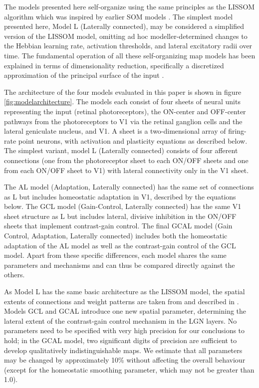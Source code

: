 \documentclass{article}
\begin{document}
The models presented here self-organize using the same principles as
the LISSOM algorithm \citep{Miikkulainen2005} which was inspired by
earlier SOM models \citep{kohonen:original,obermayer:principle}. The
simplest model presented here, Model L (Laterally connected), may be
considered a simplified version of the LISSOM model, omitting ad hoc
modeller-determined changes to the Hebbian learning rate,
activation thresholds, and lateral excitatory radii over time.
The fundamental operation of all these self-organizing map models has
been explained in terms of dimensionality reduction, specifically a discretized
approximation of the principal surface of the input
\citep{ritter:neural}.

The architecture of the four models evaluated in this paper is shown
in figure \ref{fig:modelarchitecture}. The models each consist of
four sheets of neural units representing the input (retinal
photoreceptors), the ON-center and OFF-center pathways from the
photoreceptors to V1 via the retinal ganglion cells and the lateral
geniculate nucleus, and V1. A sheet is a two-dimensional array of
firing-rate point neurons, with activation and plasticity equations
as described below. The simplest variant, model L (Laterally
connected) consists of four afferent connections (one from the
photoreceptor sheet to each ON/OFF sheets and one from each
ON/OFF sheet to V1) with lateral connectivity only in the V1 sheet.

The AL model (Adaptation, Laterally connected) has the same set of
connections as L but includes homeostatic adaptation in V1, described
by the equations below. The GCL model (Gain-Control, Laterally
connected) has the same V1 sheet structure as L but includes lateral,
divisive inhibition in the ON/OFF sheets that implement contrast-gain
control. The final GCAL model (Gain Control, Adaptation, Laterally
connected) includes both the homeostatic adaptation of the AL model as
well as the contrast-gain control of the GCL model. Apart from these
specific differences, each model shares the same parameters and
mechanisms and can thus be compared directly against the others.

  As Model L has the same basic architecture as the
  LISSOM model, the spatial extents of connections and weight patterns
  are taken from and described in \citet{Miikkulainen2005}. Models GCL
  and GCAL introduce one new spatial parameter,
    determining the lateral extent of the contrast-gain control
  mechanism in the LGN layers. No parameters need to be
  specified with very high precision for our conclusions to
  hold; in the GCAL model, two significant digits of precision are
  sufficient to develop qualitatively indistinguishable maps. We
  estimate that all parameters may be changed by approximately 10\%
  without affecting the overall behaviour (except for the homeostatic
  smoothing parameter, which may not be greater than 1.0).
\end{document}
